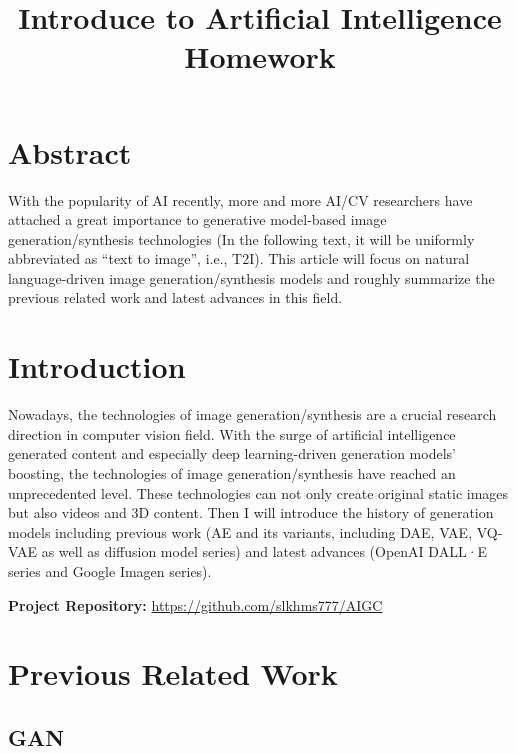 \documentclass{article}
\title{Introduce to Artificial Intelligence Homework}
\author{}
\date{}
\begin{document}
\maketitle

\section*{Abstract}

With the popularity of AI recently, more and more AI/CV researchers have attached a great importance to 
generative model-based image generation/synthesis technologies (In the following text, it will be uniformly 
abbreviated as ``text to image'', i.e., T2I). This article will focus on natural language-driven image 
generation/synthesis models and roughly summarize the previous related work and latest advances in this field.

\vspace{1.5cm}

\section*{Introduction}

Nowadays, the technologies of image generation/synthesis are a crucial research direction in computer vision 
field. With the surge of artificial intelligence generated content and especially deep learning-driven 
generation models' boosting, the technologies of image generation/synthesis have reached an unprecedented 
level. These technologies can not only create original static images but also videos and 3D content. Then I 
will introduce the history of generation models including previous work (AE and its variants, including DAE, 
VAE, VQ-VAE as well as diffusion model series) and latest advances (OpenAI DALL·E series and Google Imagen 
series).

\vspace{1.5cm}

\noindent\textbf{Project Repository:} \url{https://github.com/slkhms777/AIGC}

\newpage
\section{Previous Related Work}

\subsection{GAN}
\end{document}
